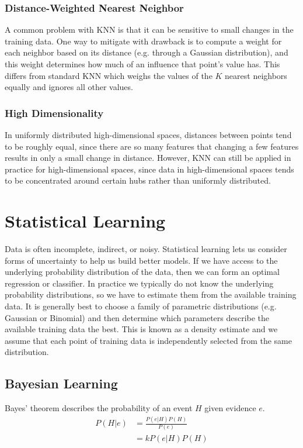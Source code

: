\documentclass[12pt]{article}
\begin{document}
        \subsubsection{Distance-Weighted Nearest Neighbor}
            A common problem with KNN is that it can be sensitive to small changes in the training data. One way to
            mitigate with drawback is to compute a weight for each neighbor based on its distance (e.g. through a
            Gaussian distribution), and this weight determines how much of an influence that point's value has. This
            differs from standard KNN which weighs the values of the $K$ nearest neighbors equally and ignores all other
            values.

        \subsubsection{High Dimensionality}
            In uniformly distributed high-dimensional spaces, distances between points tend to be roughly equal, since
            there are so many features that changing a few features results in only a small change in distance. However,
            KNN can still be applied in practice for high-dimensional spaces, since data in high-dimensional spaces
            tends to be concentrated around certain hubs rather than uniformly distributed.

\section{Statistical Learning}
    Data is often incomplete, indirect, or noisy. Statistical learning lets us consider forms of uncertainty to help us
    build better models. If we have access to the underlying probability distribution of the data, then we can form an
    optimal regression or classifier. In practice we typically do not know the underlying probability distributions, so
    we have to estimate them from the available training data. It is generally best to choose a family of parametric
    distributions (e.g. Gaussian or Binomial) and then determine which parameters describe the available training data
    the best. This is known as a density estimate and we assume that each point of training data is independently
    selected from the same distribution.

    \subsection{Bayesian Learning} \label{sec:BayesianLearning}
    Bayes' theorem \label{fact:Bayes} describes the probability of an event $H$ given evidence $e$.
    \begin{align}
        P(H|e) &= \frac{P(e|H)P(H)}{P(e)} \\
        &= kP(e|H)P(H)
    \end{align}
\end{document}

